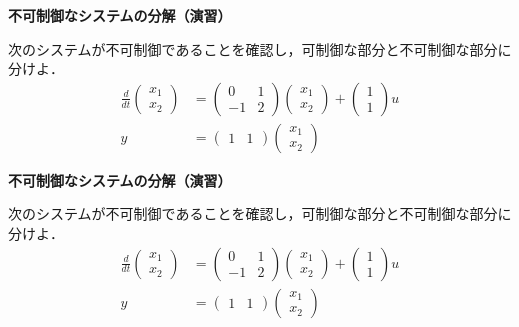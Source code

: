 \documentclass[a4paper,11pt]{jreport}
\begin{document}
\newpage

\noindent
{\bf 不可制御なシステムの分解（演習）}

次のシステムが不可制御であることを確認し，可制御な部分と不可制御な部分に分けよ．\begin{align*}
	\frac{d}{dt}
	\left (
	\begin{array}{c}
	 x_1 \\ x_2 
	\end{array}
	\right )
	& = 
	\left (
	\begin{array}{cc}
	 0 & 1 \\
	 -1 & 2
	\end{array}
	\right )
	\left (
	\begin{array}{c}
	 x_1 \\ x_2 
	\end{array}
	\right )
	+
	\left (
	\begin{array}{c}
	 1 \\ 1 
	\end{array}
	\right )
	u
\\
	y 
	&=
	\left (
	\begin{array}{cc}
	 1 & 1  
	\end{array}
	\right )
	\left (
	\begin{array}{c}
	 x_1 \\ x_2 
	\end{array}
	\right )
\end{align*}

\newpage

\noindent
{\bf 不可制御なシステムの分解（演習）}

次のシステムが不可制御であることを確認し，可制御な部分と不可制御な部分に分けよ．\begin{align*}
	\frac{d}{dt}
	\left (
	\begin{array}{c}
	 x_1 \\ x_2 
	\end{array}
	\right )
	& = 
	\left (
	\begin{array}{cc}
	 0 & 1 \\
	 -1 & 2
	\end{array}
	\right )
	\left (
	\begin{array}{c}
	 x_1 \\ x_2 
	\end{array}
	\right )
	+
	\left (
	\begin{array}{c}
	 1 \\ 1 
	\end{array}
	\right )
	u
\\
	y 
	&=
	\left (
	\begin{array}{cc}
	 1 & 1  
	\end{array}
	\right )
	\left (
	\begin{array}{c}
	 x_1 \\ x_2 
	\end{array}
	\right )
\end{align*}
\end{document}
